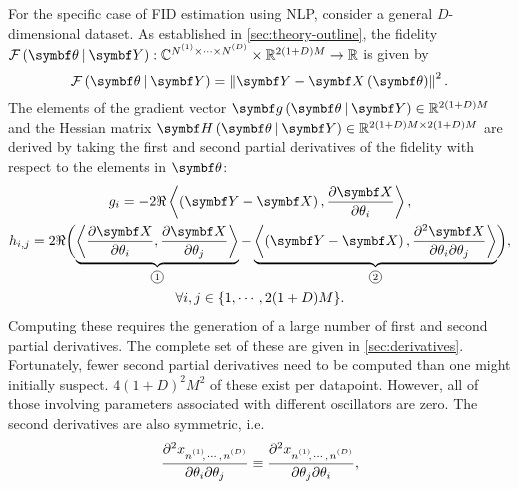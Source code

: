 For the specific case of \ac{FID} estimation using \ac{NLP}, consider a general
$D$-dimensional dataset. As established in \cref{sec:theory-outline}, the
fidelity $\FthY : \mathbb{C}^{\None \times \cdots \times \ND} \times
\mathbb{R}^{2(1 + D)M} \rightarrow \mathbb{R}$ is given by
\begin{equation}
    \FthY = \left \lVert \bY - \bXth \right \rVert^2.
    \label{eq:fidelity}
\end{equation}
The elements of the gradient vector $\bdgthY \in \mathbb{R}^{2(1+D)M}$ and
the Hessian matrix $\bdHthY \in \mathbb{R}^{2(1+D)M \times 2(1+D)M}$ are
derived by taking the first and second partial derivatives of the fidelity with
respect to the elements in $\bth$:
\begin{subequations}
    \begin{gather}
        g_i = -2 \Re
                \left\langle
                    \left(\bY - \bX\right),
                    \frac{\partial \bX}{\partial \theta_i}
                \right\rangle,
        \label{eq:grad} \\
        h_{i,j} = 2 \Re
            \biggl(
                \underbrace{
                    \left\langle
                        \frac{\partial \bX}{\partial \theta_i},
                        \frac{\partial \bX}{\partial \theta_j}
                    \right\rangle
                }_{\circled{1}}
                -
                \underbrace{
                    \left\langle
                        \left(\bY - \bX\right),
                        \frac{\partial^2 \bX}{\partial \theta_i \partial \theta_j}
                    \right\rangle
                }_{\circled{2}}
            \biggl),
            \label{eq:hess}\\
        \forall i,j \in \lbrace 1, \cdots, 2(1+D)M \rbrace.\notag
    \end{gather}
    \label{eq:fidelity-grad-hess}%
\end{subequations}
Computing these requires the generation of a large number of first and second
partial derivatives. The complete set of these are given in
\cref{sec:derivatives}.
Fortunately, fewer second partial derivatives need to be computed than one
might initially suspect. $4(1 + D)^2 M^2$ of these exist per datapoint.
However, all of those involving parameters associated with different
oscillators are zero. The second derivatives are also symmetric, i.e.
\[
    \frac{\partial^2 x_{\nonedotsnD}}{\partial \theta_i \partial \theta_j} \equiv
    \frac{\partial^2 x_{\nonedotsnD}}{\partial \theta_j \partial \theta_i},
\]
